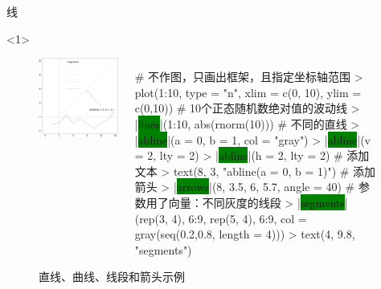 \documentclass{beamerthemeMono}
\begin{document}
\begin{frame}[c,fragile]{\subsecname}{线}
\begin{onlyenv}<1>
    \begin{figure}
 \begin{columns}
    \begin{column}[c]{.4\textwidth}
        \includegraphics[width=\columnwidth]{line-example.png}
    \end{column}

    \begin{column}[c]{.6\textwidth}
\begin{rcode}
# 不作图，只画出框架，且指定坐标轴范围
> plot(1:10, type = "n", xlim = c(0, 10), ylim = c(0,10))
# 10个正态随机数绝对值的波动线
> |\colorbox{green}{lines}|(1:10, abs(rnorm(10)))
# 不同的直线
> |\colorbox{green}{abline}|(a = 0, b = 1, col = "gray")
> |\colorbox{green}{abline}|(v = 2, lty = 2)
> |\colorbox{green}{abline}|(h = 2, lty = 2)
# 添加文本
> text(8, 3, "abline(a = 0, b = 1)")
# 添加箭头
> |\colorbox{green}{arrows}|(8, 3.5, 6, 5.7, angle = 40)
# 参数用了向量：不同灰度的线段
> |\colorbox{green}{segments}|(rep(3, 4), 6:9, rep(5, 4), 6:9, col = gray(seq(0.2,0.8, length = 4)))
> text(4, 9.8, "segments")
\end{rcode}
    \end{column}
  \end{columns}
  \caption{直线、曲线、线段和箭头示例}
\end{figure}
\end{onlyenv}


\end{frame}
\end{document}
